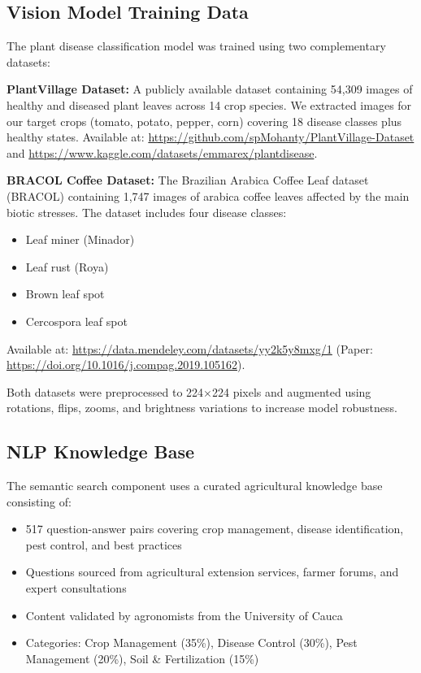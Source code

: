 \documentclass[11pt,a4paper]{article}
\begin{document}
\subsection{Vision Model Training Data}

The plant disease classification model was trained using two complementary datasets:

\textbf{PlantVillage Dataset:} A publicly available dataset containing 54,309 images of healthy and diseased plant leaves across 14 crop species. We extracted images for our target crops (tomato, potato, pepper, corn) covering 18 disease classes plus healthy states. Available at: \url{https://github.com/spMohanty/PlantVillage-Dataset} and \url{https://www.kaggle.com/datasets/emmarex/plantdisease}.

\textbf{BRACOL Coffee Dataset:} The Brazilian Arabica Coffee Leaf dataset (BRACOL) containing 1,747 images of arabica coffee leaves affected by the main biotic stresses. The dataset includes four disease classes:
\begin{itemize}
    \item Leaf miner (Minador)
    \item Leaf rust (Roya)
    \item Brown leaf spot
    \item Cercospora leaf spot
\end{itemize}
Available at: \url{https://data.mendeley.com/datasets/yy2k5y8mxg/1} (Paper: \url{https://doi.org/10.1016/j.compag.2019.105162}).

Both datasets were preprocessed to 224$\times$224 pixels and augmented using rotations, flips, zooms, and brightness variations to increase model robustness.

\subsection{NLP Knowledge Base}

The semantic search component uses a curated agricultural knowledge base consisting of:
\begin{itemize}
    \item 517 question-answer pairs covering crop management, disease identification, pest control, and best practices
    \item Questions sourced from agricultural extension services, farmer forums, and expert consultations
    \item Content validated by agronomists from the University of Cauca
    \item Categories: Crop Management (35\%), Disease Control (30\%), Pest Management (20\%), Soil \& Fertilization (15\%)
\end{itemize}
\end{document}
